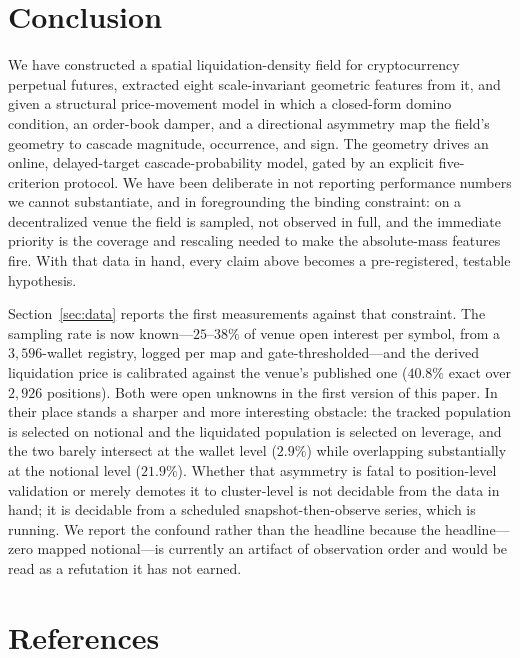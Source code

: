 \documentclass[11pt,a4paper]{article}
\theoremstyle{definition}
\theoremstyle{plain}
\begin{document}
\section{Conclusion}
\label{sec:conclusion}

We have constructed a spatial liquidation-density field for cryptocurrency perpetual futures,
extracted eight scale-invariant geometric features from it, and given a structural price-movement
model in which a closed-form domino condition, an order-book damper, and a directional asymmetry map
the field's geometry to cascade magnitude, occurrence, and sign. The geometry drives an online,
delayed-target cascade-probability model, gated by an explicit five-criterion protocol. We have been
deliberate in not reporting performance numbers we cannot substantiate, and in foregrounding the
binding constraint: on a decentralized venue the field is sampled, not observed in full, and the
immediate priority is the coverage and rescaling needed to make the absolute-mass features fire.
With that data in hand, every claim above becomes a pre-registered, testable hypothesis.

Section~\ref{sec:data} reports the first measurements against that constraint. The sampling rate is
now known---$25$--$38\%$ of venue open interest per symbol, from a $3{,}596$-wallet registry, logged
per map and gate-thresholded---and the derived liquidation price is calibrated against the venue's
published one ($40.8\%$ exact over $2{,}926$ positions). Both were open unknowns in the first
version of this paper. In their place stands a sharper and more interesting obstacle: the tracked
population is selected on notional and the liquidated population is selected on leverage, and the
two barely intersect at the wallet level ($2.9\%$) while overlapping substantially at the notional
level ($21.9\%$). Whether that asymmetry is fatal to position-level validation or merely demotes it
to cluster-level is not decidable from the data in hand; it is decidable from a scheduled
snapshot-then-observe series, which is running. We report the confound rather than the headline
because the headline---zero mapped notional---is currently an artifact of observation order and
would be read as a refutation it has not earned.

\section*{References}
\end{document}
